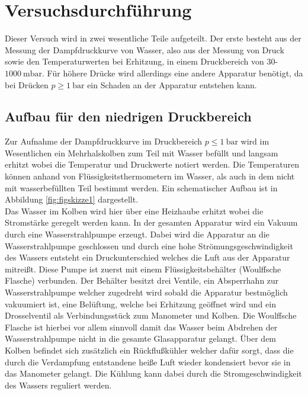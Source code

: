 \section{Versuchsdurchführung}

Dieser Versuch wird in zwei wesentliche Teile aufgeteilt. Der erste besteht aus der Messung der Dampfdruckkurve von Wasser, also aus der Messung von Druck sowie den Temperaturwerten bei Erhitzung, in einem 
Druckbereich von $30$-$\SI{1000}{\milli\bar}$. Für höhere Drücke wird allerdings eine andere Apparatur benötigt, da bei Drücken $p \geq \SI{1}{\bar}$ ein Schaden an der Apparatur entstehen kann.

\subsection{Aufbau für den niedrigen Druckbereich} %
Zur Aufnahme der Dampfdruckkurve im Druckbereich $p \leq \SI{1}{\bar}$ wird im Wesentlichen ein Mehrhalskolben zum Teil mit Wasser befüllt und langsam erhitzt wobei die Temperatur und Druckwerte notiert werden. 
Die Temperaturen können anhand von Flüssigkeitsthermometern im Wasser, als auch in dem nicht mit wasserbefüllten Teil bestimmt werden.
Ein schematischer Aufbau ist in Abbildung \ref{fig:figskizze1} dargestellt. 
\newline
\\
Das Wasser im Kolben wird hier über eine Heizhaube erhitzt wobei die Stromstärke geregelt werden kann. 
In der gesamten Apparatur wird ein Vakuum durch eine Wasserstrahlpumpe erzeugt. Dabei wird die Apparatur an die Wasserstrahlpumpe geschlossen und durch eine hohe Strömungsgeschwindigkeit
des Wassers entsteht ein Druckunterschied welches die Luft aus der Apparatur mitreißt. Diese Pumpe ist zuerst mit einem Flüssigkeitsbehälter (Woulffsche Flasche) verbunden. Der Behälter besitzt drei Ventile, ein Absperrhahn zur Wasserstrahlpumpe welcher 
zugedreht wird sobald die Apparatur bestmöglich vakuumiert ist, eine Belüftung, welche bei Erhitzung geöffnet wird und ein Drosselventil als Verbindungsstück zum Manometer und Kolben. 
Die Woulffsche Flasche ist hierbei vor allem sinnvoll damit das Wasser beim Abdrehen der Wasserstrahlpumpe nicht in die gesamte Glasapparatur gelangt.
Über dem Kolben befindet sich zusätzlich ein Rückflußkühler welcher dafür sorgt, dass die durch die Verdampfung entstandene heiße Luft wieder kondensiert bevor sie in das Manometer gelangt. Die Kühlung kann dabei durch die Stromgeschwindigkeit
des Wassers reguliert werden.

